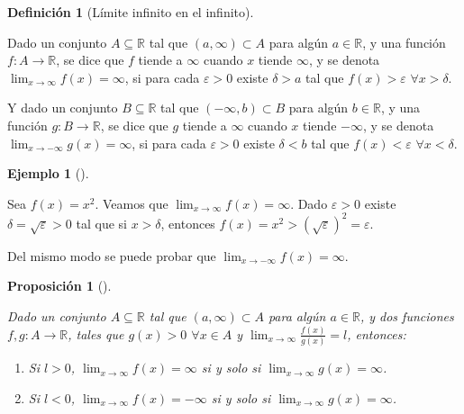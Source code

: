 \documentclass[
  a4paper,
]{scrreport}
\theoremstyle{definition}
\newtheorem{example}{Ejemplo}[chapter]
\theoremstyle{plain}
\theoremstyle{definition}
\newtheorem{definition}{Definición}[chapter]
\theoremstyle{definition}
\theoremstyle{plain}
\theoremstyle{plain}
\newtheorem{proposition}{Proposición}[chapter]
\theoremstyle{remark}
\begin{document}
\begin{definition}[Límite infinito en el
infinito]\protect\hypertarget{def-limite-infinito-en-infinito}{}\label{def-limite-infinito-en-infinito}

Dado un conjunto \(A\subseteq \mathbb{R}\) tal que
\((a,\infty)\subset A\) para algún \(a\in\mathbb{R}\), y una función
\(f:A\to \mathbb{R}\), se dice que \(f\) tiende a \(\infty\) cuando
\(x\) tiende \(\infty\), y se denota \(\lim_{x\to\infty}f(x)=\infty\),
si para cada \(\varepsilon>0\) existe \(\delta>a\) tal que
\(f(x)>\varepsilon\) \(\forall x>\delta\).

Y dado un conjunto \(B\subseteq \mathbb{R}\) tal que
\((-\infty,b)\subset B\) para algún \(b\in\mathbb{R}\), y una función
\(g:B\to \mathbb{R}\), se dice que \(g\) tiende a \(\infty\) cuando
\(x\) tiende \(-\infty\), y se denota \(\lim_{x\to-\infty}g(x)=\infty\),
si para cada \(\varepsilon>0\) existe \(\delta<b\) tal que
\(f(x)<\varepsilon\) \(\forall x<\delta\).

\end{definition}

\begin{example}[]\protect\hypertarget{exm-limite-infinito-en-infinito}{}\label{exm-limite-infinito-en-infinito}

Sea \(f(x)=x^2\). Veamos que \(\lim_{x\to\infty}f(x)=\infty\). Dado
\(\varepsilon>0\) existe \(\delta=\sqrt{\varepsilon}>0\) tal que si
\(x>\delta\), entonces \(f(x)=x^2>(\sqrt{\varepsilon})^2 =\varepsilon\).

Del mismo modo se puede probar que \(\lim_{x\to-\infty}f(x)=\infty\).

\end{example}

\begin{proposition}[]\protect\hypertarget{prp-cociente-limites-infinitos}{}\label{prp-cociente-limites-infinitos}

Dado un conjunto \(A\subseteq \mathbb{R}\) tal que
\((a,\infty)\subset A\) para algún \(a\in\mathbb{R}\), y dos funciones
\(f,g:A\to \mathbb{R}\), tales que \(g(x)>0\) \(\forall x\in A\) y
\(\lim_{x\to\infty}\frac{f(x)}{g(x)}=l\), entonces:

\begin{enumerate}
\def\labelenumi{\arabic{enumi}.}
\item
  Si \(l>0\), \(\lim_{x\to\infty}f(x)=\infty\) si y solo si
  \(\lim_{x\to\infty}g(x)=\infty\).
\item
  Si \(l<0\), \(\lim_{x\to\infty}f(x)=-\infty\) si y solo si
  \(\lim_{x\to\infty}g(x)=\infty\).
\end{enumerate}

\end{proposition}
\end{document}
